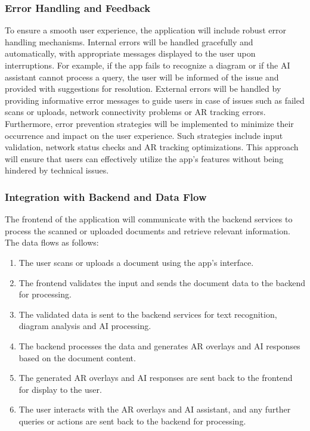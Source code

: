 \documentclass[10pt]{article}
\begin{document}
    \subsubsection{Error Handling and Feedback}

        To ensure a smooth user experience, the application will include robust error handling mechanisms. Internal errors will be handled gracefully and automatically, with appropriate messages displayed to the user upon interruptions. For example, if the app fails to recognize a diagram or if the AI assistant
        cannot process a query, the user will be informed of the issue and provided with suggestions for resolution. External errors will be handled by providing informative error messages to guide users in case of issues such as failed scans or uploads, network connectivity problems or AR tracking errors. Furthermore,
        error prevention strategies will be implemented to minimize their occurrence and impact on the user experience. Such strategies include input validation, network status checks and AR tracking optimizations. This approach will ensure that users can effectively utilize the app's features without being hindered by technical issues.



    \subsubsection{Integration with Backend and Data Flow}

        The frontend of the application will communicate with the backend services to process the scanned or uploaded documents and retrieve relevant information. The data flows as follows:
        \begin{enumerate}
            \item The user scans or uploads a document using the app's interface.
            \item The frontend validates the input and sends the document data to the backend for processing.
            \item The validated data is sent to the backend services for text recognition, diagram analysis and AI processing.
            \item The backend processes the data and generates AR overlays and AI responses based on the document content.
            \item The generated AR overlays and AI responses are sent back to the frontend for display to the user.
            \item The user interacts with the AR overlays and AI assistant, and any further queries or actions are sent back to the backend for processing.
        \end{enumerate}
        
\end{document}

